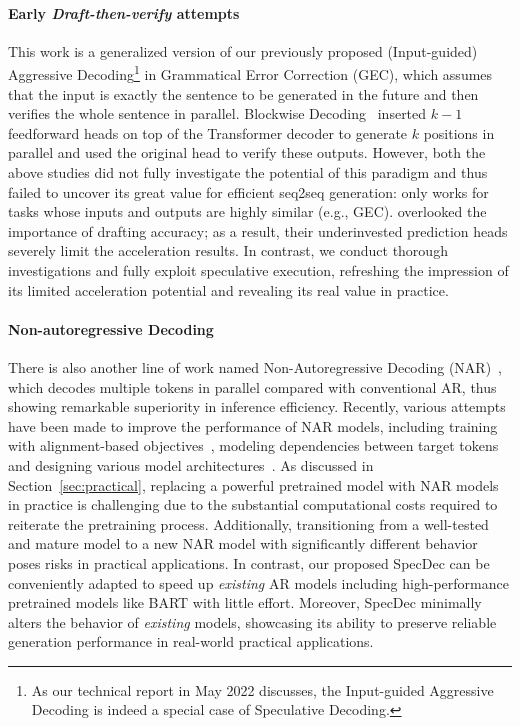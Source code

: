 \paragraph{Early \textit{Draft-then-verify} attempts} This work is a generalized version of our previously proposed (Input-guided) Aggressive Decoding\footnote{As our technical report \citep{ge2022lossless} in May 2022 discusses, the Input-guided Aggressive Decoding is indeed a special case of Speculative Decoding.} \citep{Sun:2020SAD} in Grammatical Error Correction (GEC), which assumes that the input is exactly the sentence to be generated in the future and then verifies the whole sentence in parallel. Blockwise Decoding~\citep{Stern:2018blockwise} inserted $k-1$ feedforward heads on top of the Transformer decoder to generate $k$ positions in parallel and used the original head to verify these outputs. However, both the above studies did not fully investigate the potential of this paradigm and thus failed to uncover its great value for efficient seq2seq generation: \citet{Sun:2020SAD} only works for tasks whose inputs and outputs are highly similar (e.g., GEC). \citet{Stern:2018blockwise} overlooked the importance of drafting accuracy; as a result, their underinvested prediction heads severely limit the acceleration results. In contrast, we conduct thorough investigations and fully exploit speculative execution, refreshing the impression of its limited acceleration potential and revealing its real value in practice.

\paragraph{Non-autoregressive Decoding} There is also another line of work named Non-Autoregressive Decoding (NAR)~\cite{gu:2018}, which decodes multiple tokens in parallel compared with conventional AR, thus showing remarkable superiority in inference efficiency. Recently, various attempts have been made to improve the performance of NAR models, including training with alignment-based objectives~\cite{Libovicky:2018, Ghazvininejad:2020a, Saharia:2020, Gu:2021, Shao:2022ctc}, modeling dependencies between target tokens~\cite{Ghazvininejad:2019, Shu:2020, Qian:2020, Bao:2021} and designing various model architectures~\cite{Zheng:2021, Huang:2022dat}. As discussed in Section~\ref{sec:practical}, replacing a powerful pretrained model with NAR models in practice is challenging due to the substantial computational costs required to reiterate the pretraining process. Additionally, transitioning from a well-tested and mature model to a new NAR model with significantly different behavior poses risks in practical applications. In contrast, our proposed SpecDec can be conveniently adapted to speed up \textit{existing} AR models including high-performance pretrained models like BART with little effort. Moreover, SpecDec minimally alters the behavior of \textit{existing} models, showcasing its ability to preserve reliable generation performance in real-world practical applications.

